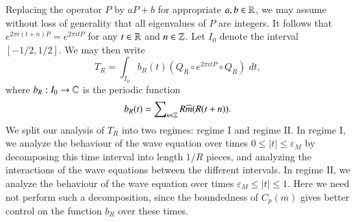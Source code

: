 Replacing the operator $P$ by $aP + b$ for appropriate $a,b \in \operatorname{\mathbb{R}}$, we may assume without loss of generality that all eigenvalues of $P$ are integers. It follows that $e^{2 \pi i (t + n) P} = e^{2 \pi i t P}$ for any $t \in \operatorname{\mathbb{R}}$ and $n \in \operatorname{\mathbb{Z}}$. Let $I_0$ denote the interval $[-1/2,1/2]$. We may then write
%
\begin{equation}
    T_R = \int_{I_0} b_R(t) (Q_R \circ e^{2 \pi i tP} \circ Q_R)\; dt,
\end{equation}
%
where $b_R: I_0 \to \operatorname{\mathbb{C}}$ is the periodic function
%
\begin{equation}
    b_R(t) = \sum\nolimits_{n \in \operatorname{\mathbb{Z}}} R \widehat{m}(R (t + n)).
\end{equation}
We split our analysis of $T_R$ into two regimes: regime $\text{I}$ and regime $\text{II}$. In regime $\text{I}$, we analyze the behaviour of the wave equation over times $0 \leq |t| \leq \varepsilon_M$ by decomposing this time interval into length $1/R$ pieces, and analyzing the interactions of the wave equations between the different intervals. In regime $\text{II}$, we analyze the behaviour of the wave equation over times $\varepsilon_M \leq |t| \leq 1$. Here we need not perform such a decomposition, since the boundedness of $C_p(m)$ gives better control on the function $b_R$ over these times.

